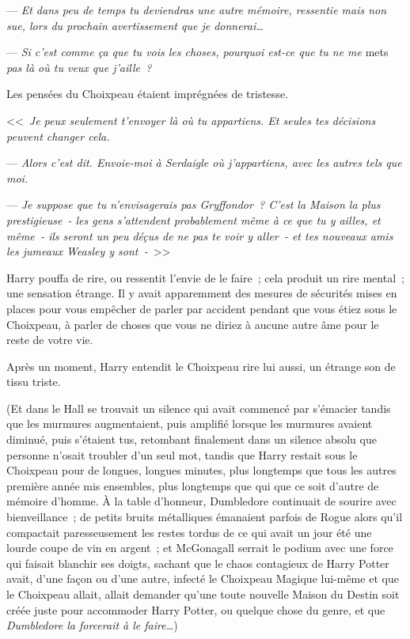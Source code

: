 --- \emph{Et dans peu de temps tu deviendras une autre mémoire, ressentie mais non sue, lors du prochain avertissement que je donnerai…}

--- \emph{Si c'est comme ça que tu vois les choses, pourquoi est-ce que tu ne me} mets \emph{pas là où tu veux que j'aille~?}

Les pensées du Choixpeau étaient imprégnées de tristesse.

<<~\emph{Je peux seulement t'envoyer là où tu appartiens. Et seules tes décisions peuvent changer cela.}

--- \emph{Alors c'est dit. Envoie-moi à Serdaigle où j'appartiens, avec les autres tels que moi.}

--- \emph{Je suppose que tu n'envisagerais pas Gryffondor~? C'est la Maison la plus prestigieuse~- les gens s'attendent probablement même à ce que tu y ailles, et même~- ils seront un peu déçus de ne pas te voir y aller~- et tes nouveaux amis les jumeaux Weasley y sont~-}~>>

Harry pouffa de rire, ou ressentit l'envie de le faire~; cela produit un rire mental~; une sensation étrange. Il y avait apparemment des mesures de sécurités mises en places pour vous empêcher de parler par accident pendant que vous étiez sous le Choixpeau, à parler de choses que vous ne diriez à aucune autre âme pour le reste de votre vie.

Après un moment, Harry entendit le Choixpeau rire lui aussi, un étrange son de tissu triste.

(Et dans le Hall se trouvait un silence qui avait commencé par s'émacier tandis que les murmures augmentaient, puis amplifié lorsque les murmures avaient diminué, puis s'étaient tus, retombant finalement dans un silence absolu que personne n'osait troubler d'un seul mot, tandis que Harry restait sous le Choixpeau pour de longues, longues minutes, plus longtemps que tous les autres première année mis ensembles, plus longtemps que qui que ce soit d'autre de mémoire d'homme. À la table d'honneur, Dumbledore continuait de sourire avec bienveillance~; de petits bruits métalliques émanaient parfois de Rogue alors qu'il compactait paresseusement les restes tordus de ce qui avait un jour été une lourde coupe de vin en argent~; et McGonagall serrait le podium avec une force qui faisait blanchir ses doigts, sachant que le chaos contagieux de Harry Potter avait, d'une façon ou d'une autre, infecté le Choixpeau Magique lui-même et que le Choixpeau allait, allait demander qu'une toute nouvelle Maison du Destin soit créée juste pour accommoder Harry Potter, ou quelque chose du genre, et que \emph{Dumbledore la forcerait à le faire…})

